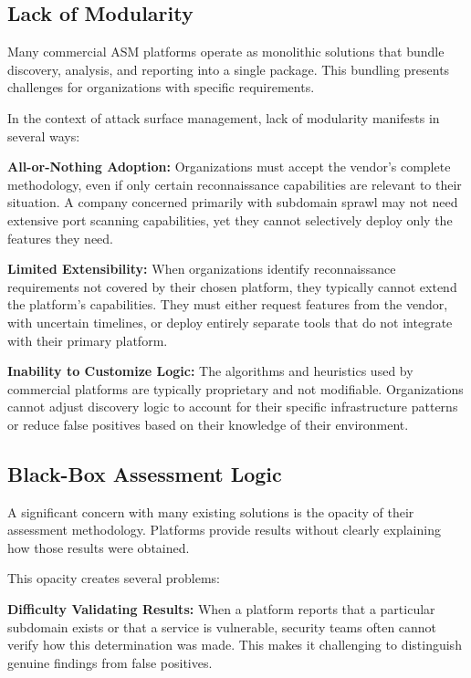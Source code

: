 \documentclass[a4paper,12pt]{report}
\begin{document}
\subsection{Lack of Modularity}

Many commercial ASM platforms operate as monolithic solutions that bundle discovery, analysis, and reporting into a single package. This bundling presents challenges for organizations with specific requirements.\hfill \break

In the context of attack surface management, lack of modularity manifests in several ways:\hfill \break

\textbf{All-or-Nothing Adoption:} Organizations must accept the vendor's complete methodology, even if only certain reconnaissance capabilities are relevant to their situation. A company concerned primarily with subdomain sprawl may not need extensive port scanning capabilities, yet they cannot selectively deploy only the features they need.\hfill \break

\textbf{Limited Extensibility:} When organizations identify reconnaissance requirements not covered by their chosen platform, they typically cannot extend the platform's capabilities. They must either request features from the vendor, with uncertain timelines, or deploy entirely separate tools that do not integrate with their primary platform.\hfill \break

\textbf{Inability to Customize Logic:} The algorithms and heuristics used by commercial platforms are typically proprietary and not modifiable. Organizations cannot adjust discovery logic to account for their specific infrastructure patterns or reduce false positives based on their knowledge of their environment.\hfill \break

\subsection{Black-Box Assessment Logic}

A significant concern with many existing solutions is the opacity of their assessment methodology. Platforms provide results without clearly explaining how those results were obtained.\hfill \break

This opacity creates several problems:\hfill \break

\textbf{Difficulty Validating Results:} When a platform reports that a particular subdomain exists or that a service is vulnerable, security teams often cannot verify how this determination was made. This makes it challenging to distinguish genuine findings from false positives.\hfill \break
\end{document}
